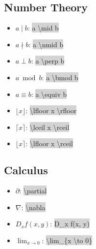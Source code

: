 \documentclass[12pt]{article}
\theoremstyle{definition}
\newcommand{\ltc}[1]{\colorbox{lightgray}{\textbackslash #1}}
\newcommand{\ltcc}[1]{\colorbox{lightgray}{#1}}
\begin{document}
 	\subsection{Number Theory}
 	\begin{multicols}{2}
 	\begin{itemize}
	 	\item $a \mid b$: \ltcc{a \textbackslash mid b}
	 	\item $a \nmid b$: \ltcc{a \textbackslash nmid b}
	 	\item $a \perp b$: \ltcc{a \textbackslash perp b}
	 	\item $a \bmod b$: \ltcc{a \textbackslash bmod b}
	 	\item $a \equiv b$: \ltcc{a \textbackslash equiv b}
	 	\item $\lfloor x \rfloor$: \ltcc{\textbackslash lfloor x \textbackslash rfloor}
	 	\item $\lceil x \rceil$: \ltcc{\textbackslash lceil x \textbackslash rceil}
	 	\item $\lfloor x \rceil$: \ltcc{\textbackslash lfloor x \textbackslash rceil}
 	\end{itemize}	
 	\end{multicols}
 	
 	\subsection{Calculus}
 	\begin{multicols}{2}
 	\begin{itemize}
	 	\item $\partial$: \ltc{partial}
	 	\item $\nabla$: \ltc{nabla}
	 	\item $D_xf(x, y)$: \ltcc{D\_x f(x, y)}
	 	\item $\lim_{x \to 0}$: \ltc{lim\_\{x \textbackslash to 0\}}
 	\end{itemize}	
 	\end{multicols}
	
\end{document}

